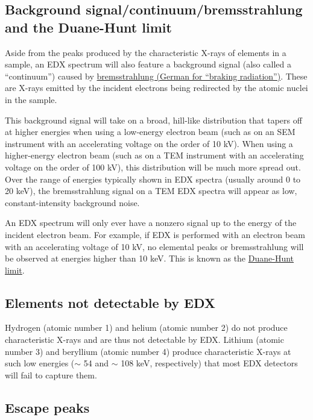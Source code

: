 \documentclass[letterpaper, 12pt]{article}
\begin{document}
\subsection*{Background signal/continuum/bremsstrahlung and the Duane-Hunt limit}

Aside from the peaks produced by the characteristic X-rays of elements in a sample, an EDX spectrum will also feature a background signal (also called a ``continuum'') caused by \href{https://en.wikipedia.org/wiki/Bremsstrahlung}{bremsstrahlung (German for ``braking radiation'')}. These are X-rays emitted by the incident electrons being redirected by the atomic nuclei in the sample.

This background signal will take on a broad, hill-like distribution that tapers off at higher energies when using a low-energy electron beam (such as on an SEM instrument with an accelerating voltage on the order of 10 kV). When using a higher-energy electron beam (such as on a TEM instrument with an accelerating voltage on the order of 100 kV), this distribution will be much more spread out. Over the range of energies typically shown in EDX spectra (usually around 0 to 20 keV), the bremsstrahlung signal on a TEM EDX spectra will appear as low, constant-intensity background noise.

An EDX spectrum will only ever have a nonzero signal up to the energy of the incident electron beam. For example, if EDX is performed with an electron beam with an accelerating voltage of 10 kV, no elemental peaks or bremsstrahlung will be observed at energies higher than 10 keV. This is known as the \href{https://en.wikipedia.org/wiki/Duane%E2%80%93Hunt_law}{Duane-Hunt limit}.

\subsection*{Elements not detectable by EDX}

Hydrogen (atomic number 1) and helium (atomic number 2) do not produce characteristic X-rays and are thus not detectable by EDX. Lithium (atomic number 3) and beryllium (atomic number 4) produce characteristic X-rays at such low energies ($\sim$ 54 and $\sim$ 108 keV, respectively) that most EDX detectors will fail to capture them.

\subsection*{Escape peaks}
\end{document}

